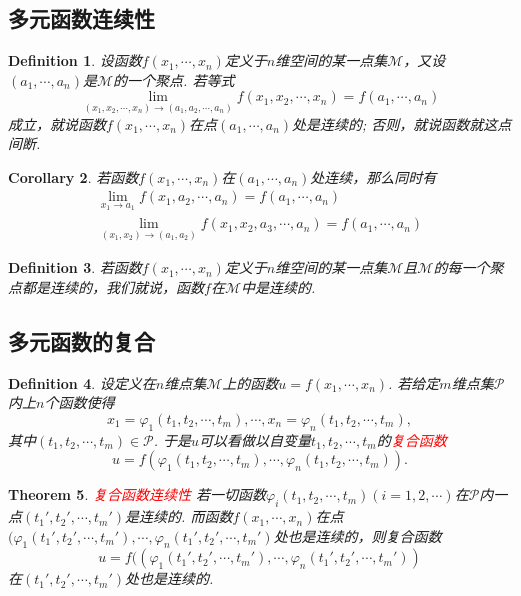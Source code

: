 \documentclass{article}
\newtheorem{theorem}{Theorem}[section]
\newtheorem{corollary}[theorem]{Corollary}
\newtheorem{definition}[theorem]{Definition}
\newcommand{\redt}[1]{\textcolor{red}{#1}}
\begin{document}
\subsection{多元函数连续性}

\begin{definition}
\rm 设函数$f(x_1,\cdots,x_n)$定义于$n$维空间的某一点集$\mathcal{M}$，又设$(a_1,\cdots,a_n)$是$\mathcal{M}$的一个聚点. 若等式
$$
\lim\limits_{(x_1,x_2,\cdots,x_n) \to (a_1,a_2,\cdots,a_n)}f(x_1,x_2,\cdots,x_n) = f(a_1,\cdots,a_n)
$$
成立，就说函数$f(x_1,\cdots,x_n)$在点$(a_1,\cdots,a_n)$处是连续的; 否则，就说函数就这点间断. 
\end{definition}

\begin{corollary}
\rm 若函数$f(x_1,\cdots,x_n)$在$(a_1,\cdots,a_n)$处连续，那么同时有
$$
\begin{array}{ll}
\lim\limits_{x_1 \to a_1}f(x_1,a_2,\cdots,a_n) = f(a_1,\cdots,a_n) \\
\lim\limits_{(x_1,x_2) \to (a_1,a_2)}f(x_1,x_2,a_3,\cdots,a_n) = f(a_1,\cdots,a_n)
\end{array}
$$
\end{corollary}

\begin{definition}
\rm 若函数$f(x_1,\cdots,x_n)$定义于$n$维空间的某一点集$\mathcal{M}$且$\mathcal{M}$的每一个聚点都是连续的，我们就说，函数$f$在$\mathcal{M}$中是连续的. 
\end{definition}


\subsection{多元函数的复合}

\begin{definition}
\rm 设定义在$n$维点集$\mathcal{M}$上的函数$u = f(x_1,\cdots,x_n)$. 若给定$m$维点集$\mathcal{P}$内上$n$个函数使得
$$
x_1 = \varphi_1(t_1,t_2,\cdots,t_m), \cdots, x_n =\varphi_n(t_1,t_2,\cdots,t_m),
$$
其中$(t_1,t_2,\cdots,t_m) \in \mathcal{P}$. 于是$u$可以看做以自变量$t_1,t_2,\cdots,t_m$的\redt{复合函数}
$$
u = f(\varphi_1(t_1,t_2,\cdots,t_m),\cdots,\varphi_n(t_1,t_2,\cdots,t_m)).
$$
\end{definition}


\begin{theorem}
\rm \redt{复合函数连续性} 若一切函数$\varphi_i(t_1,t_2,\cdots,t_m)(i=1,2,\cdots)$在$\mathcal{P}$内一点$(t_1',t_2',\cdots,t_m')$是连续的. 而函数$f(x_1, \cdots,x_n)$在点$(\varphi_1(t_1',t_2',\cdots,t_m'),\cdots,\varphi_n(t_1',t_2',\cdots,t_m')$处也是连续的，则复合函数
$$
u = f((\varphi_1(t_1',t_2',\cdots,t_m'),\cdots,\varphi_n(t_1',t_2',\cdots,t_m'))
$$
在$(t_1',t_2',\cdots,t_m')$处也是连续的. 
\end{theorem}
\end{document}
